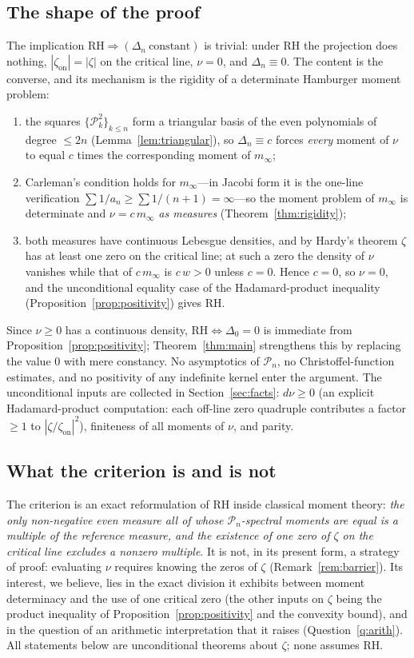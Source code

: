\documentclass[11pt]{amsart}
\theoremstyle{definition}
\theoremstyle{remark}
\newcommand{\RH}{\mathrm{RH}}
\newcommand{\minf}{m_\infty}
\newcommand{\zon}{\zeta_{\mathrm{on}}}
\begin{document}
\subsection{The shape of the proof}
The implication $\RH\Rightarrow(\Delta_n\ \text{constant})$ is trivial:
under RH the projection does nothing, $|\zon|=|\zeta|$ on the critical line,
$\nu=0$, and $\Delta_n\equiv0$. The content is the converse, and its
mechanism is the rigidity of a determinate Hamburger moment problem:
\begin{enumerate}[(1)]
\item the squares $\{\mathcal P_k^{2}\}_{k\le n}$ form a triangular basis of
the even polynomials of degree $\le2n$ (Lemma~\ref{lem:triangular}), so
$\Delta_n\equiv c$ forces \emph{every} moment of $\nu$ to equal $c$ times the
corresponding moment of $\minf$;
\item Carleman's condition holds for $\minf$---in Jacobi form it is the
one-line verification
$\sum 1/a_n\ge\sum 1/(n+1)=\infty$---so the moment problem of $\minf$ is
determinate and $\nu=c\,\minf$ \emph{as measures}
(Theorem~\ref{thm:rigidity});
\item both measures have continuous Lebesgue densities, and by Hardy's
theorem \cite{Hardy1914} $\zeta$ has at least one zero on the critical line;
at such a zero the density of $\nu$ vanishes while that of $c\,\minf$ is
$c\,w>0$ unless $c=0$. Hence $c=0$, so $\nu=0$, and the unconditional
equality case of the Hadamard-product inequality
(Proposition~\ref{prop:positivity}) gives RH.
\end{enumerate}
Since $\nu\ge0$ has a continuous density, $\RH\iff\Delta_0=0$ is immediate
from Proposition~\ref{prop:positivity}; Theorem~\ref{thm:main} strengthens
this by replacing the value $0$ with mere constancy.
No asymptotics of $\mathcal P_n$, no Christoffel-function estimates, and no
positivity of any indefinite kernel enter the argument. The unconditional
inputs are collected in Section~\ref{sec:facts}: $d\nu\ge0$ (an explicit
Hadamard-product computation: each off-line zero quadruple contributes a
factor $\ge1$ to $|\zeta/\zon|^{2}$), finiteness of all moments of $\nu$,
and parity.

\subsection{What the criterion is and is not}
The criterion is an exact reformulation of RH inside classical moment
theory: \emph{the only non-negative even measure all of whose
$\mathcal P_n$-spectral moments are equal is a multiple of the reference
measure, and the existence of one zero of $\zeta$ on the critical line
excludes a nonzero multiple}. It is not, in its present form, a strategy of proof: evaluating
$\nu$ requires knowing the zeros of $\zeta$ (Remark~\ref{rem:barrier}). Its
interest, we believe, lies in the exact division it exhibits between
moment determinacy and the use of one critical zero (the other inputs on
$\zeta$ being the product inequality of Proposition~\ref{prop:positivity}
and the convexity bound), and in the question of an arithmetic
interpretation that it raises (Question~\ref{q:arith}). All statements below are
unconditional theorems about $\zeta$; none assumes RH.
\end{document}
